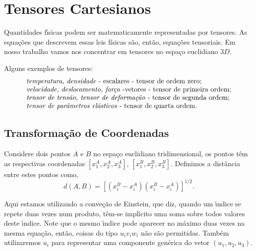 
\section{Tensores Cartesianos}

Quantidades f\'\i sicas podem ser matematicamente representadas
por tensores. As equa\c{c}\~oes que descrevem essas leis f\'isicas s\~ao, ent\~ao, equa\c{c}\~oes tensoriais.
Em nosso trabalho vamos nos concentrar em tensores no espa\c{c}o
euclidiano $3D$.

Alguns exemplos de tensores: \begin{equation}
  \begin{array}{l}
               \mbox{\emph{temperatura, densidade} - escalares - tensor de ordem zero}; \\
               \mbox{\emph{velocidade, deslocamento, for\c{c}a} -vetores - tensor de primeira ordem}; \\
               \mbox{\emph{tensor de tens\~ao, tensor de deforma\c{c}\~ao} - tensor de segunda ordem}; \\
               \mbox{\emph{tensor de par\^ametros el\'asticos} -  tensor de quarta ordem}. \\

\end{array}  
\end{equation}


\subsection{Transforma\c{c}\~ao de Coordenadas}

Considere dois pontos $A$ e $B$ no espa\c{c}o euclidiano tridimensional, os
pontos t\^em as respectivas coordenadas $[x_{1}^{A}, x_{2}^{A},
x_{3}^{A}]$, $[x_{1}^{B}, x_{2}^{B}, x_{3}^{B}]$. Definimos a
dist\^ancia entre estes pontos como,
\begin{equation}
d(A,B)=\left[(x_{i}^{B}-x_{i}^{A})(x_{i}^{B}-x_{i}^{A})\right]^{1/2}.
\end{equation}


Aqui estamos utilizando a conve\c{c}\~ao de Einstein, que diz,
quando um \'\i ndice se repete duas vezes num produto, t\^em-se
 impl\'\i cito uma soma sobre todos valores deste \'\i ndice.
 Note que o mesmo \'\i ndice pode aparecer no m\'aximo duas vezes na mesma equa\c{c}\~ao,
 ent\~ao, coisas do tipo $u_{i}v_{i}w_{i}$ n\~ao s\~ao permitidas.
Tamb\'em utilizaremos $u_{i}$ para representar uma componente gen\'erica do vetor $(u_{1},
u_{2}, u_{3})$.

